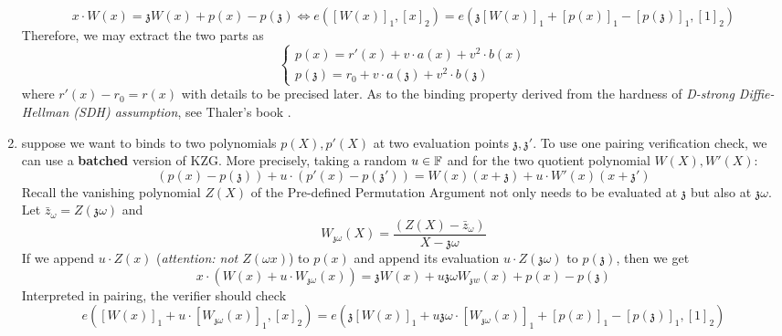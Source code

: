 \documentclass{article}
\begin{document}
\begin{enumerate}
\begin{equation*}
x \cdot W(x) = \mathfrak{z} W(x) + p(x) - p(\mathfrak{z}) \Longleftrightarrow  e([W(x)]_1, [x]_2) = e(\mathfrak{z}[W(x)]_1 + [p(x)]_1 - [p(\mathfrak{z})]_1, [1]_2)
\end{equation*}
Therefore, we may extract the two parts as 
\begin{equation*}
\begin{cases}
p(x) = r'(x) + v \cdot a(x) + v^2 \cdot b(x) \\
p(\mathfrak{z}) = r_0 + v \cdot a(\mathfrak{z}) + v^2 \cdot b(\mathfrak{z})
\end{cases}
\end{equation*}
where $r'(x) - r_0 = r(x)$ with details to be precised later. As to the binding property derived from the hardness of \textit{D-strong Diffie-Hellman (SDH) assumption}, see Thaler's book \cite{ThalerBookZKP}. 
\item\label{item:115} suppose we want to binds to two polynomials $p(X), p'(X)$ at two evaluation points $\mathfrak{z}, \mathfrak{z}'$. To use one pairing verification check, we can use a \textbf{batched} version of KZG. More precisely, taking a random $u \in \mathbb{F}$ and for the two quotient polynomial $W(X), W'(X)$:
\begin{equation*}
\left(p(x) - p(\mathfrak{z}) \right) + u \cdot \left( p'(x) - p(\mathfrak{z}')\right) = W(x) \left( x + \mathfrak{z} \right) + u \cdot W'(x)(x + \mathfrak{z}')
\end{equation*}
Recall the vanishing polynomial $Z(X)$ of the Pre-defined Permutation Argument not only needs to be evaluated at $\mathfrak{z}$ but also at $\mathfrak{z} \omega$. Let $\bar{z}_{\omega} = Z(\mathfrak{z} \omega)$ and 
\begin{equation*}
W_{\mathfrak{z}\omega}(X) = \frac{(Z(X) - \bar{z}_{\omega})}{X - \mathfrak{z}\omega}
\end{equation*}
If we append $u \cdot Z(x)$ (\textit{attention: not $Z(\omega x)$}) to $p(x)$ and append its evaluation $u \cdot Z(\mathfrak{z} \omega)$ to $p(\mathfrak{z})$, then we get
\begin{equation*}
x \cdot \left( W(x) + u \cdot W_{\mathfrak{z} \omega}(x) \right) = \mathfrak{z} W(x) + u \mathfrak{z} \omega W_{\mathfrak{z}w}(x)+ p(x) - p(\mathfrak{z})
\end{equation*}
Interpreted in pairing, the verifier should check
\begin{equation*}
e([W(x)]_1 + u \cdot [W_{\mathfrak{z}\omega}(x)]_1, [x]_2) = e(\mathfrak{z}[W(x)]_1 + u \mathfrak{z} \omega \cdot [W_{\mathfrak{z}\omega}(x)]_1 + [p(x)]_1 - [p(\mathfrak{z})]_1, [1]_2)

\end{equation*}
\end{enumerate}
\end{document}
